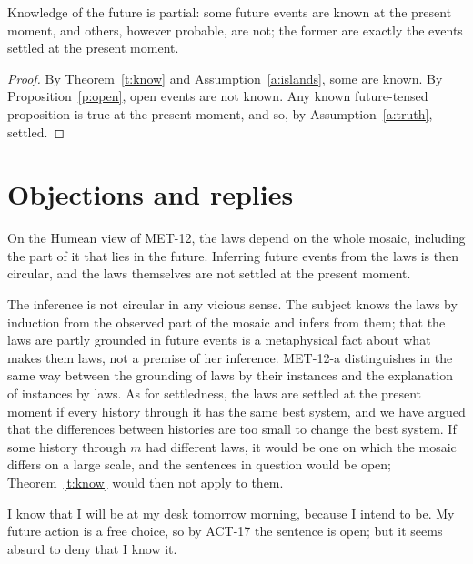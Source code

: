\documentclass{situationist-preprint}
\begin{document}
\begin{corollary}\label{c:partial}
Knowledge of the future is partial: some future events are known at the present moment, and others, however probable, are not; the former are exactly the events settled at the present moment.
\end{corollary}

\begin{proof}
By Theorem~\ref{t:know} and Assumption~\ref{a:islands}, some are known. By Proposition~\ref{p:open}, open events are not known. Any known future-tensed proposition is true at the present moment, and so, by Assumption~\ref{a:truth}, settled.
\end{proof}

\section{Objections and replies}

\begin{objection}\label{o:hume}
On the Humean view of MET-12, the laws depend on the whole mosaic, including the part of it that lies in the future. Inferring future events from the laws is then circular, and the laws themselves are not settled at the present moment.
\end{objection}

\begin{reply}
The inference is not circular in any vicious sense. The subject knows the laws by induction from the observed part of the mosaic and infers from them; that the laws are partly grounded in future events is a metaphysical fact about what makes them laws, not a premise of her inference. MET-12-a distinguishes in the same way between the grounding of laws by their instances and the explanation of instances by laws. As for settledness, the laws are settled at the present moment if every history through it has the same best system, and we have argued that the differences between histories are too small to change the best system. If some history through $m$ had different laws, it would be one on which the mosaic differs on a large scale, and the sentences in question would be open; Theorem~\ref{t:know} would then not apply to them.
\end{reply}

\begin{objection}\label{o:intention}
I know that I will be at my desk tomorrow morning, because I intend to be. My future action is a free choice, so by ACT-17 the sentence is open; but it seems absurd to deny that I know it.
\end{objection}
\end{document}
